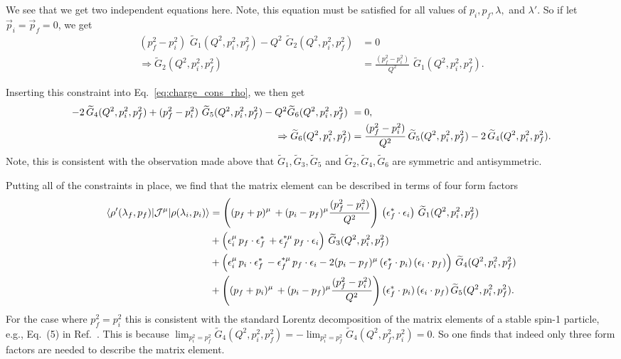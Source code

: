 We see that we get two independent equations here. Note, this equation must be satisfied for all values of $p_i,p_f,\lambda,$ and $\lambda'$. So if let $\vec{p}_i=\vec{p}_f=0$, we get 
\begin{align}
(p_f^2-p_i^2) \,\, \widetilde{G}_1(Q^2,p_i^2,p_f^2)
-Q^2 \,\,\widetilde{G}_2(Q^2,p_i^2,p_f^2)&=0
\\
\Rightarrow
\widetilde{G}_2(Q^2,p_i^2,p_f^2)&=
\frac{(p_f^2-p_i^2)}{Q^2} \,\, \widetilde{G}_1(Q^2,p_i^2,p_f^2).
\end{align}

Inserting this constraint into Eq.~\ref{eq:charge_cons_rho}, we then get
\begin{align}
-2
\,\widetilde{G}_4(Q^2,p_i^2,p_f^2)
+(p_f^2-p_i^2) \,\,\widetilde{G}_5(Q^2,p_i^2,p_f^2)
-Q^2\widetilde{G}_6(Q^2,p_i^2,p_f^2) \,\,
&=0,
\nonumber\\
\Rightarrow
\widetilde{G}_6(Q^2,p_i^2,p_f^2)&=\frac{(p_f^2-p_i^2)}{Q^2} \,\widetilde{G}_5(Q^2,p_i^2,p_f^2)-
2
\,\widetilde{G}_4(Q^2,p_i^2,p_f^2).
\end{align}
Note, this is consistent with the observation made above that $\widetilde{G}_1,\widetilde{G}_3,\widetilde{G}_5$ and $\widetilde{G}_2,\widetilde{G}_4,\widetilde{G}_6$ are symmetric and antisymmetric.

Putting all of the constraints in place, we find that the matrix element can be described in terms of four form factors
\begin{align}
\langle\rho'(\lambda_f,p_f)|{\mathcal{J}}^{\mu}|\rho(\lambda_i,p_i)\rangle
&=
\left((p_f+p)^\mu \,+(p_i-p_f)^\mu\frac{(p_f^2-p_i^2)}{Q^2} \right)\,\left(\epsilon_f^*\cdot \epsilon_i\right)\, \widetilde{G}_1(Q^2,p_i^2,p_f^2)\,
\nonumber\\&
+\left(\epsilon_i^\mu\, p_f\cdot \epsilon_f^*\,
+\epsilon_f^{*\mu}\, p_f\cdot \epsilon_i\right)\,\widetilde{G}_3(Q^2,p_i^2,p_f^2)\,
\nonumber\\
&+\left(\epsilon_i^\mu\, p_i\cdot \epsilon_f^*\,-\epsilon_f^{*\mu}\, p_f\cdot \epsilon_i
-2
(p_i-p_f)^\mu \,(\epsilon_f^*\cdot p_i)\,(\epsilon_i\cdot p_f)
\right)
\,\widetilde{G}_4(Q^2,p_i^2,p_f^2)
\nonumber\\&
+\left((p_f+p_i)^\mu \,+(p_i-p_f)^\mu\frac{(p_f^2-p_i^2)}{Q^2} \right)(\epsilon_f^*\cdot p_i)\,(\epsilon_i\cdot p_f)\,\widetilde{G}_5(Q^2,p_i^2,p_f^2).
\label{eq:rho_to_rho_FF}
\end{align}
 For the case where $p_f^2=p_i^2$ this is consistent with the standard Lorentz decomposition of the matrix elements of a stable spin-1 particle, e.g., Eq.~(5) in Ref.~\cite{Shultz:2015pfa}. This is because $\lim_{p_i^2=p_f^2}\widetilde{G}_4(Q^2,p_i^2,p_f^2)=-\lim_{p_i^2=p_f^2}\widetilde{G}_4(Q^2,p_f^2,p_i^2)=0$. So one finds that indeed only three form factors are needed to describe the matrix element. 

